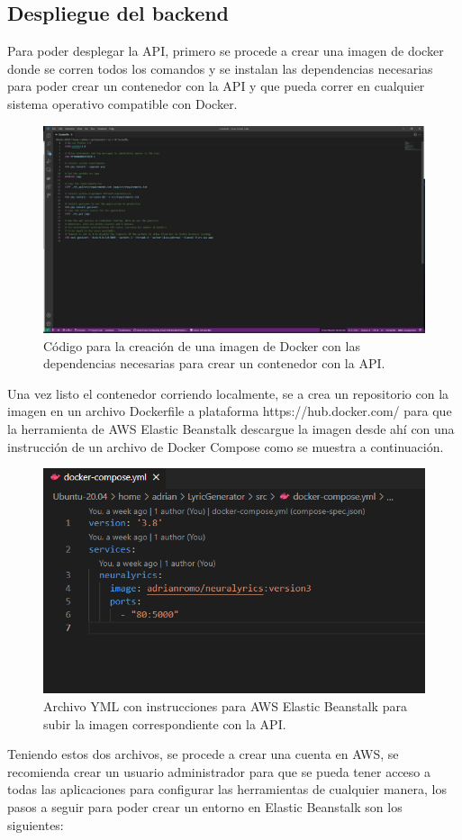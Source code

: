 \documentclass[12pt, a4paper, titlepage]{report}
\begin{document}
\subsection{Despliegue del backend}
Para poder desplegar la API, primero se procede a crear una imagen de docker donde se corren todos los comandos y se instalan las dependencias necesarias para poder crear un contenedor con la API y que pueda correr en cualquier sistema operativo compatible con Docker.
\begin{figure}[H]
	\includegraphics[width=12cm]{./imagenes/Desarrollo/BackEnd/dockerfile.png}
	\centering 
	\caption{Código para la creación de una imagen de Docker con las dependencias necesarias para crear un contenedor con la API.}
\end{figure}
Una vez listo el contenedor corriendo localmente, se a crea un repositorio con la imagen en un archivo Dockerfile a plataforma https://hub.docker.com/ para que la herramienta de AWS Elastic Beanstalk descargue la imagen desde ahí con una instrucción de un archivo de Docker Compose como se muestra a continuación.
\begin{figure}[H]
	\includegraphics[width=12cm]{./imagenes/Desarrollo/BackEnd/dockercompose.png}
	\centering 
	\caption{Archivo YML con instrucciones para AWS Elastic Beanstalk para subir la imagen correspondiente con la API.}
\end{figure}
Teniendo estos dos archivos, se procede a crear una cuenta en AWS, se recomienda crear un usuario administrador para que se pueda tener acceso a todas las aplicaciones para configurar las herramientas de cualquier manera, los pasos a seguir para poder crear un entorno en Elastic Beanstalk son los siguientes:
\end{document}
